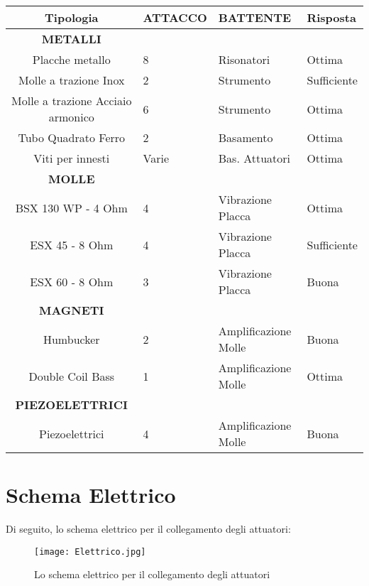 \begin{table}[htp]
\begin{center}

\begin{tabular}{cp{2cm}p{2cm}p{2cm}} \textbf{Tipologia}&\textbf{ATTACCO}&\textbf{BATTENTE}&\textbf{Risposta}\\
\hline \textbf{METALLI}\\
\hline Placche metallo&8&Risonatori&Ottima\\
\hline Molle a trazione Inox&2&Strumento&Sufficiente\\
\hline Molle a trazione Acciaio armonico&6&Strumento&Ottima\\
\hline Tubo Quadrato Ferro&2&Basamento&Ottima\\
\hline Viti per innesti&Varie&Bas. Attuatori&Ottima\\
\hline \textbf{MOLLE}\\
\hline BSX 130 WP - 4 Ohm&4&Vibrazione Placca&Ottima\\
\hline ESX 45 - 8 Ohm&4&Vibrazione Placca&Sufficiente\\
\hline ESX 60 - 8 Ohm&3&Vibrazione Placca&Buona\\
\hline \textbf{MAGNETI}\\
\hline Humbucker&2&Amplificazione Molle&Buona\\
\hline Double Coil Bass&1&Amplificazione Molle&Ottima\\
\hline \textbf{PIEZOELETTRICI} \\
\hline Piezoelettrici&4&Amplificazione Molle&Buona\\
\hline
\end{tabular}

\end{center}
\label{default}
\end{table}%

\clearpage


\section{Schema Elettrico}
Di seguito, lo schema elettrico per il collegamento degli attuatori:

\begin{figure}[htbp]
\begin{center}
\texttt{[image: Elettrico.jpg]}
\caption{Lo schema elettrico per il collegamento degli attuatori}
\label{default}
\end{center}
\end{figure}

